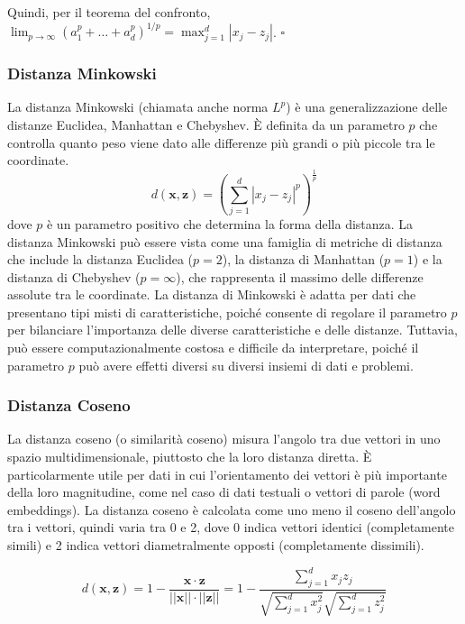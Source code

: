    Quindi, per il teorema del confronto, $\lim_{p \to \infty} (a^p_1 + \ldots + a^p_d)^{1/p} = \max_{j=1}^d |x_j - z_j|$. $\square$

\subsubsection{Distanza Minkowski} La distanza Minkowski (chiamata anche norma $L^p$) è
    una generalizzazione delle distanze Euclidea, Manhattan e Chebyshev. 
    È definita da un parametro $p$ che controlla quanto peso viene dato alle differenze più 
    grandi o più piccole tra le coordinate.
    \[
    d(\mathbf{x}, \mathbf{z}) = \left( \sum_{j=1}^d |x_j - z_j|^p \right)^{\frac{1}{p}}
    \]
    dove \( p \) è un parametro positivo che determina la forma della distanza. La distanza 
    Minkowski può essere vista come una famiglia di metriche di distanza che include la 
    distanza Euclidea ($p = 2$), la distanza di Manhattan ($p = 1$) e la distanza di 
    Chebyshev ($p = \infty$), che rappresenta il massimo delle differenze assolute 
    tra le coordinate. La distanza di Minkowski è adatta per dati che presentano tipi misti 
    di caratteristiche, poiché consente di regolare il parametro $p$ per bilanciare 
    l'importanza delle diverse caratteristiche e delle distanze. Tuttavia, può essere 
    computazionalmente costosa e difficile da interpretare, poiché il parametro $p$ può 
    avere effetti diversi su diversi insiemi di dati e problemi.

\subsubsection{Distanza Coseno} La distanza coseno (o similarità coseno) misura 
    l'angolo tra due vettori in uno spazio multidimensionale, piuttosto che la loro distanza diretta. 
    È particolarmente utile per dati in cui l'orientamento dei vettori è più importante della loro 
    magnitudine, come nel caso di dati testuali o vettori di parole (word embeddings). La distanza 
    coseno è calcolata come uno meno il coseno dell'angolo tra i vettori, quindi varia tra 0 e 2, 
    dove 0 indica vettori identici (completamente simili) e 2 indica vettori diametralmente opposti 
    (completamente dissimili).

    \[
d(\mathbf{x}, \mathbf{z}) = 1 - \frac{\mathbf{x} \cdot \mathbf{z}}{||\mathbf{x}|| \cdot ||\mathbf{z}||} = 1 - \frac{\sum_{j=1}^d x_j z_j}{\sqrt{\sum_{j=1}^d x_j^2} \sqrt{\sum_{j=1}^d z_j^2}}
\]

